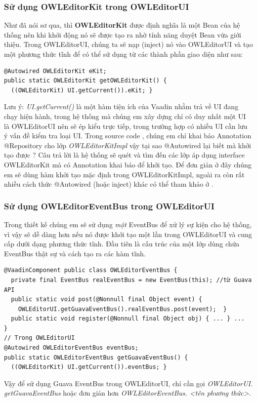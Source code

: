 \subsubsection{Sử dụng OWLEditorKit trong OWLEditorUI}
Như đã nói sơ qua, thì \textbf{OWLEditorKit} được định nghĩa là một Bean của hệ thống nên khi khởi động nó sẽ được tạo ra nhờ tính năng duyệt Bean vừa giới thiệu. Trong OWLEditorUI, chúng ta sẽ nạp (inject) nó vào OWLEditorUI và tạo một phương thức tĩnh để có thể sử dụng từ các thành phần giao diện như sau:
\begin{verbatim}
@Autowired OWLEditorKit eKit; 
public static OWLEditorKit getOWLEditorKit() {
  ((OWLEditorKit) UI.getCurrent()).eKit; }
\end{verbatim}
Lưu ý: \textit{UI.getCurrent()} là một hàm tiện ích của Vaadin nhằm trả về UI đang chạy hiện hành, trong hệ thống mà chúng em xây dựng chỉ có duy nhất một UI là OWLEditorUI nên sẽ ép kiểu trực tiếp, trong trường hợp có nhiều UI cần lưu ý vấn đề kiểm tra loại UI. Trong source code \cite{owleditorSrc}, chúng em chỉ khai báo Annotation @Repository cho lớp \textit{OWLEditorKitImpl} vậy tại sao @Autowired lại biết mà khởi tạo được ? Câu trả lời là hệ thống sẽ quét và tìm đến các lớp áp dụng interface OWLEditorKit mà có Annotation khai báo để khởi tạo. Để đơn giản ở đây chúng em sẽ dùng hàm khởi tạo mặc định trong OWLEditorKitImpl, ngoài ra còn rất nhiều cách thức @Autowired (hoặc inject) khác có thể tham khảo ở \cite{springboot}.
\subsubsection{Sử dụng OWLEditorEventBus trong OWLEditorUI}
Trong thiết kế chúng em sẽ sử dụng \textit{một} EventBus để xử lý sự kiện cho hệ thống, vì vậy sẽ dễ dàng hơn nếu nó được khởi tạo một lần trong OWLEditorUI và cung cấp dưới dạng phương thức tĩnh. Đầu tiên là cấu trúc của một lớp dùng chứa EventBus thật sự và cách tạo ra các hàm tĩnh.
\begin{verbatim}
@VaadinComponent public class OWLEditorEventBus {
  private final EventBus realEventBus = new EventBus(this); //từ Guava API
  public static void post(@Nonnull final Object event) {
    OWLEditorUI.getGuavaEventBus().realEventBus.post(event);  }
  public static void register(@Nonnull final Object obj) { ... } ...
}
// Trong OWLEditorUI
@Autowired OWLEditorEventBus eventBus;
public static OWLEditorEventBus getGuavaEventBus() {
  ((OWLEditorKit) UI.getCurrent()).eventBus; }
\end{verbatim}
Vậy để sử dụng Guava EventBus trong OWLEditorUI, chỉ cần gọi \textit{OWLEditorUI. getGuavaEventBus} hoặc đơn giản hơn \textit{OWLEditorEventBus. <tên phương thức>}.
